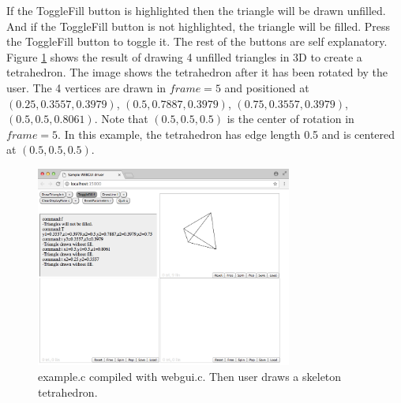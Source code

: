 If the ToggleFill button is highlighted then the triangle will be drawn unfilled. And if the ToggleFill button is not 
highlighted, the triangle will be filled. Press the ToggleFill button to toggle it.
The rest of the buttons are self explanatory. Figure \ref{fig:6-2} shows the result of drawing
4 unfilled triangles in 3D to create a tetrahedron. The image shows the tetrahedron after it has been rotated by
the user. The 4 vertices are drawn in $frame=5$ and positioned at $(0.25,0.3557,0.3979)$, $(0.5,0.7887,0.3979)$, 
$(0.75,0.3557,0.3979)$, $(0.5,0.5,0.8061)$. Note that $(0.5,0.5,0.5)$ is the center of rotation in $frame=5$.
In this example, the tetrahedron has edge length 0.5 and is centered at $(0.5,0.5,0.5)$.

\begin{figure}[H]
\centering
\includegraphics[width=0.75\textwidth]{pix/driver3.png}
\caption{example.c compiled with webgui.c. Then user draws a skeleton tetrahedron.}
\label{fig:6-2}
\end{figure} 

